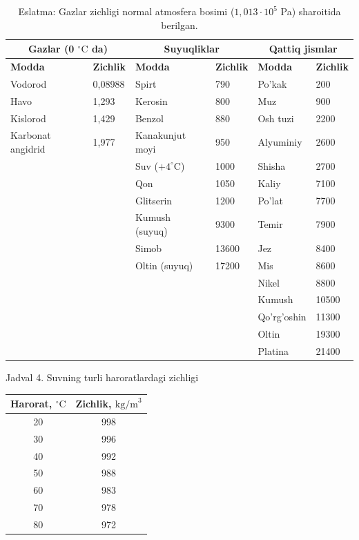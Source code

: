 \begin{table}[!ht]
\centering
\small
\begin{tabularx}{\textwidth}{Xl | Xl | Xl}
\toprule
\multicolumn{2}{c|}{\textbf{Gazlar (0 $^\circ\text{C}$ da)}} & \multicolumn{2}{c|}{\textbf{Suyuqliklar}} & \multicolumn{2}{c}{\textbf{Qattiq jismlar}} \\
\midrule
\textbf{Modda} & \textbf{Zichlik} & \textbf{Modda} & \textbf{Zichlik} & \textbf{Modda} & \textbf{Zichlik} \\
\midrule
Vodorod & 0,08988 & Spirt & 790 & Po'kak & 200 \\
Havo & 1,293 & Kerosin & 800 & Muz & 900 \\
Kislorod & 1,429 & Benzol & 880 & Osh tuzi & 2200 \\
Karbonat angidrid & 1,977 & Kanakunjut moyi & 950 & Alyuminiy & 2600 \\
& & Suv ($+4 ^\circ\text{C}$) & 1000 & Shisha & 2700 \\
& & Qon & 1050 & Kaliy & 7100 \\
& & Glitserin & 1200 & Po'lat & 7700 \\
& & Kumush (suyuq) & 9300 & Temir & 7900 \\
& & Simob & 13600 & Jez & 8400 \\
& & Oltin (suyuq) & 17200 & Mis & 8600 \\
& & & & Nikel & 8800 \\
& & & & Kumush & 10500 \\
& & & & Qo'rg'oshin & 11300 \\
& & & & Oltin & 19300 \\
& & & & Platina & 21400 \\
\bottomrule
\end{tabularx}
\caption*{Eslatma: Gazlar zichligi normal atmosfera bosimi ($1,013 \cdot 10^5$ Pa) sharoitida berilgan.}
\end{table}










\Large{Jadval 4. Suvning turli haroratlardagi zichligi}

\begin{table}[!ht]
\centering
\begin{tabular}{cc}
\toprule
\textbf{Harorat, $^\circ\text{C}$} & \textbf{Zichlik, $\text{kg/m}^3$} \\
\midrule
20 & 998 \\
30 & 996 \\
40 & 992 \\
50 & 988 \\
60 & 983 \\
70 & 978 \\
80 & 972 \\
\bottomrule
\end{tabular}
\end{table}
